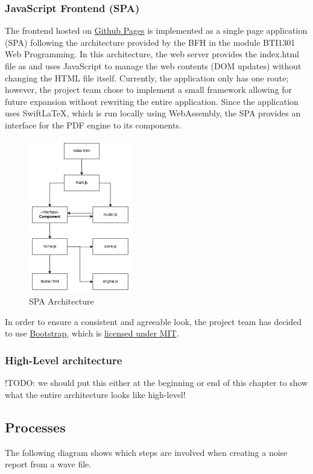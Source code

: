 \subsubsection{JavaScript Frontend (SPA)}
The frontend hosted on \href{https://decibel-threshold-event-displayer.github.io/}{Github Pages} is implemented as a single page application (SPA) following the architecture provided by the BFH in the module BTI1301 Web Programming.
In this architecture, the web server provides the index.html file as and uses JavaScript to manage the web contents (DOM updates) without changing the HTML file itself. Currently, the application only has one route; however, the project team chose to
implement a small framework allowing for future expansion without rewriting the entire application. Since the application uses SwiftLaTeX, which is run locally using WebAssembly, the SPA provides an interface for the PDF engine to
its components.
\begin{figure}[H]
    \centering
    \includegraphics[width=0.4\textwidth]{../assets/spa_diagram.png}
    \caption{SPA Architecture}
\end{figure}
In order to ensure a consistent and agreeable look, the project team has decided to use \href{https://getbootstrap.com/}{Bootstrap}, which is \href{https://github.com/twbs/bootstrap/blob/main/LICENSE}{licensed under MIT}.

\subsubsection{High-Level architecture}
!TODO: we should put this either at the beginning or end of this chapter to show what the entire architecture looks like high-level!

\subsection{Processes}
The following diagram shows which steps are involved when creating a noise report from a wave file.

